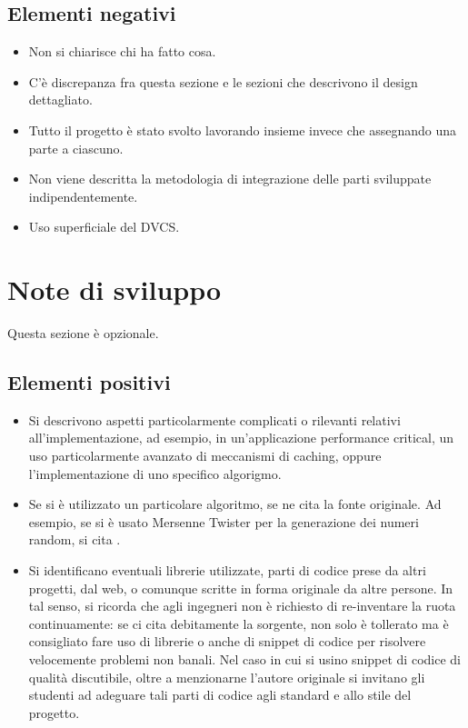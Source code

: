 \documentclass[a4paper,12pt]{report}
\begin{document}
\subsection*{Elementi negativi}
\begin{itemize}
	\item Non si chiarisce chi ha fatto cosa.
	\item C'è discrepanza fra questa sezione e le sezioni che descrivono il design dettagliato.
	\item Tutto il progetto è stato svolto lavorando insieme invece che assegnando una parte a ciascuno.
	\item Non viene descritta la metodologia di integrazione delle parti sviluppate indipendentemente.
	\item Uso superficiale del DVCS.
\end{itemize}

\section{Note di sviluppo}

Questa sezione è opzionale.

\subsection*{Elementi positivi}

\begin{itemize}
 \item Si descrivono aspetti particolarmente complicati o rilevanti relativi all'implementazione, ad esempio, in un'applicazione performance critical, un uso particolarmente avanzato di meccanismi di caching, oppure l'implementazione di uno specifico algorigmo.
 \item Se si è utilizzato un particolare algoritmo, se ne cita la fonte originale. Ad esempio, se si è usato Mersenne Twister per la generazione dei numeri random, si cita \cite{mersenne}.
 \item Si identificano eventuali librerie utilizzate, parti di codice prese da altri progetti, dal web, o comunque scritte in forma originale da altre persone. In tal senso, si ricorda che agli ingegneri non è richiesto di re-inventare la ruota continuamente: se ci cita debitamente la sorgente, non solo è tollerato ma è consigliato fare uso di librerie o anche di snippet di codice per risolvere velocemente problemi non banali. Nel caso in cui si usino snippet di codice di qualità discutibile, oltre a menzionarne l'autore originale si invitano gli studenti ad adeguare tali parti di codice agli standard e allo stile del progetto.
\end{itemize}
\end{document}
